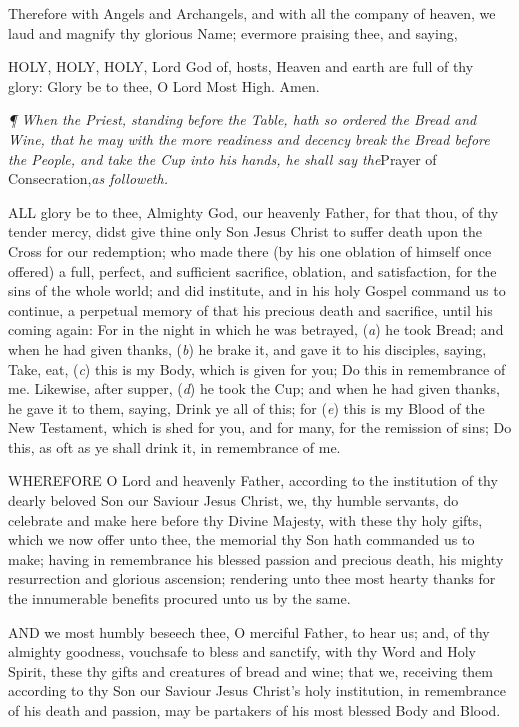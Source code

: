 Therefore with Angels and Archangels, and with all
the company of heaven, we laud and magnify thy glorious Name; evermore
praising thee, and saying,

HOLY, HOLY, HOLY, Lord God of, hosts, Heaven and earth are full of thy
glory: Glory be to thee, O Lord Most High. Amen.

\emph{¶
When the Priest, standing before the Table, hath so ordered the Bread
and Wine, that he may with the more readiness and decency break the Bread
before the People, and take the Cup into his hands, he shall say the}Prayer
of Consecration,\emph{as followeth.}

ALL
glory be to thee, Almighty God, our heavenly Father, for that thou, of
thy tender mercy, didst give thine only Son Jesus Christ to suffer death
upon the Cross for our redemption; who made there (by his one oblation
of himself once offered) a full, perfect, and sufficient sacrifice, oblation,
and satisfaction, for the sins of the whole world; and did institute,
and in his holy Gospel command us to continue, a
perpetual memory of that his precious death and sacrifice, until
his coming again: For in the night in which he was betrayed, (\emph{a}) he took Bread; and when he had given thanks,
(\emph{b}) he brake it, and gave it to his disciples, saying, Take,
eat, (\emph{c}) this is my Body, which is given for you; Do this in
remembrance of me. Likewise, after supper, (\emph{d}) he took the Cup;
and when he had given thanks, he gave it to them, saying, Drink ye all
of this; for (\emph{e}) this is my Blood of the New Testament, which
is shed for you, and for many, for the remission of sins; Do this, as
oft as ye shall drink it, in remembrance of me.

WHEREFORE
O Lord and heavenly Father, according to the institution of thy dearly
beloved Son our Saviour Jesus Christ, we, thy humble servants, do celebrate
and make here before thy Divine Majesty, with these thy holy gifts, which
we now offer unto thee, the memorial thy Son hath commanded us to make;
having in remembrance his blessed passion and precious death, his mighty
resurrection and glorious ascension; rendering unto thee most hearty thanks
for the innumerable benefits procured unto us by the same.

AND
we most humbly beseech thee, O merciful Father, to hear us; and, of thy
almighty goodness, vouchsafe to bless and sanctify, with thy Word and
Holy Spirit, these thy gifts and creatures of bread and wine; that we,
receiving them according to thy Son our Saviour Jesus Christ’s holy
institution, in remembrance of his death and passion, may be partakers
of his most blessed Body and Blood.

